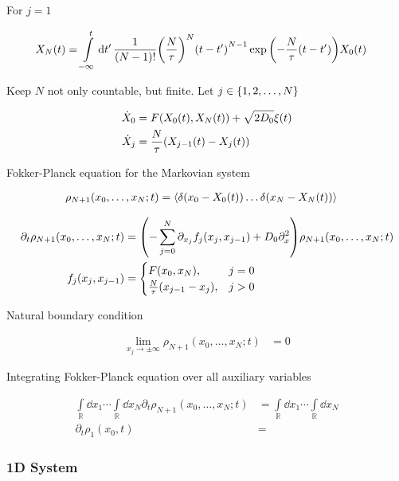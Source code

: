 \documentclass[a4paper,10pt]{article}
\newcommand{\suml}{\sum\limits}
\newcommand{\intl}{\int\limits}
\begin{document}
For $j=1$

\begin{align}
	X_{N}(t)
	&=
	\intl_{-\infty}^t
	\dd{t^\prime}
	\frac{1}{(N-1)!}
	\pqty{
		\frac{N}{\tau}
	}^N
	\pqty{t-t^\prime}^{N-1}
	\exp\pqty{-\frac{N}{\tau}(t-t^\prime)}
	X_{0}(t)
\end{align}

Keep $N$ not only countable, but finite. Let $j\in\Bqty{1,2,\ldots,N}$

\begin{align}
	\dot{X}_0
	&=
	F(X_0(t),X_N(t))
	+
	\sqrt{2D_0}
	\xi(t)
	\\
	\dot{X}_j
	&=
	\frac{N}{\tau}
	\pqty{X_{j-1}(t)-X_{j}(t)}
\end{align}

Fokker-Planck equation for the Markovian system

\begin{align}
	\rho_{N+1}(x_0,\ldots,x_N;t)
	&=
	\expval{
		\delta(x_0-X_0(t))
		\ldots
		\delta(x_N-X_N(t))
	}
\end{align}

\begin{align}
	\partial_t
	\rho_{N+1}(x_0,\ldots,x_N;t)
	&=
	\pqty{
		-
		\suml_{j=0}^N
		\partial_{x_j}
		f_j(x_j,x_{j-1})
		+
		D_0
		\partial_x^2
	}
	\rho_{N+1}(x_0,\ldots,x_N;t)
\\
	f_j(x_j,x_{j-1})
	&=
	\begin{cases}
		F(x_0,x_N),&j=0
		\\
		\frac{N}{\tau}
		\pqty{x_{j-1}-x_j},&j>0
	\end{cases}
\end{align}

Natural boundary condition

\begin{align}
	\lim\limits_{x_j\to\pm\infty}
	\rho_{N+1}(x_0,\ldots,x_N;t)
	&=
	0
\end{align}

Integrating Fokker-Planck equation over all auxiliary variables

\begin{align}
	\intl_\mathbb{R}
	\dd{x_1}
	\cdots
	\intl_\mathbb{R}
	\dd{x_N}
	\partial_t
	\rho_{N+1}(x_0,\ldots,x_N;t)
	&=
	\intl_\mathbb{R}
	\dd{x_1}
	\cdots
	\intl_\mathbb{R}
	\dd{x_N}
\\
	\partial_t
	\rho_1(x_0,t)
	&=
\end{align}

\subsubsection*{1D System}
\end{document}
